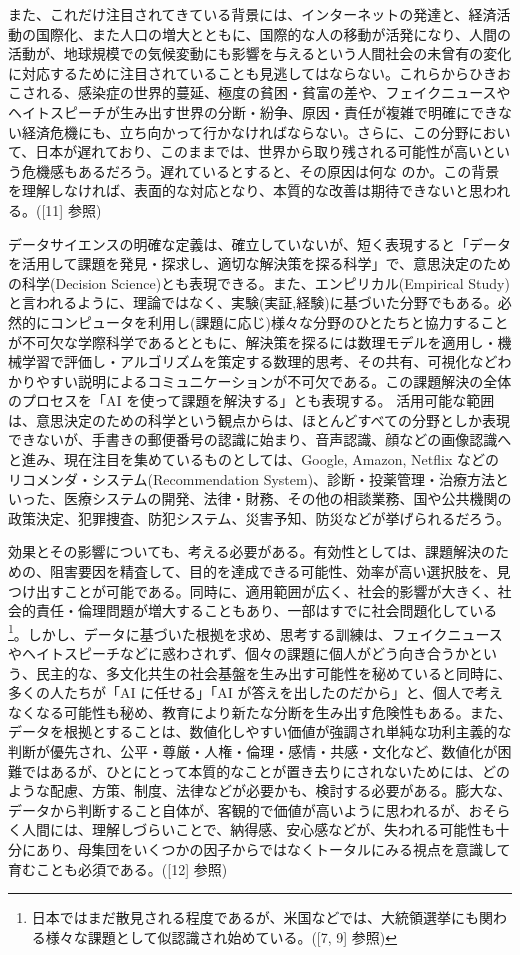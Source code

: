 \documentclass[
]{book}
\theoremstyle{definition}
\theoremstyle{definition}
\theoremstyle{definition}
\theoremstyle{definition}
\theoremstyle{remark}
\begin{document}
また、これだけ注目されてきている背景には、インターネットの発達と、経済活動の国際化、また人口の増大とともに、国際的な人の移動が活発になり、人間の活動が、地球規模での気候変動にも影響を与えるという人間社会の未曾有の変化に対応するために注目されていることも見逃してはならない。これらからひきおこされる、感染症の世界的蔓延、極度の貧困・貧富の差や、フェイクニュースやヘイトスピーチが生み出す世界の分断・紛争、原因・責任が複雑で明確にできない経済危機にも、立ち向かって行かなければならない。さらに、この分野において、日本が遅れており、このままでは、世界から取り残される可能性が高いという危機感もあるだろう。遅れているとすると、その原因は何な
のか。この背景を理解しなければ、表面的な対応となり、本質的な改善は期待できないと思われる。({[}11{]} 参照)

データサイエンスの明確な定義は、確立していないが、短く表現すると「データを活用して課題を発見・探求し、適切な解決策を探る科学」で、意思決定のための科学(Decision Science)とも表現できる。また、エンピリカル(Empirical Study)と言われるように、理論ではなく、実験(実証,経験)に基づいた分野でもある。必然的にコンピュータを利用し(課題に応じ)様々な分野のひとたちと協力することが不可欠な学際科学であるとともに、解決策を探るには数理モデルを適用し・機械学習で評価し・アルゴリズムを策定する数理的思考、その共有、可視化などわかりやすい説明によるコミュニケーションが不可欠である。この課題解決の全体のプロセスを「AI を使って課題を解決する」とも表現する。 活用可能な範囲は、意思決定のための科学という観点からは、ほとんどすべての分野としか表現できないが、手書きの郵便番号の認識に始まり、音声認識、顔などの画像認識へと進み、現在注目を集めているものとしては、Google, Amazon, Netflix などのリコメンダ・システム(Recommendation System)、診断・投薬管理・治療方法といった、医療システムの開発、法律・財務、その他の相談業務、国や公共機関の政策決定、犯罪捜査、防犯システム、災害予知、防災などが挙げられるだろう。

効果とその影響についても、考える必要がある。有効性としては、課題解決のための、阻害要因を精査して、目的を達成できる可能性、効率が高い選択肢を、見つけ出すことが可能である。同時に、適用範囲が広く、社会的影響が大きく、社会的責任・倫理問題が増大することもあり、一部はすでに社会問題化している\footnote{日本ではまだ散見される程度であるが、米国などでは、大統領選挙にも関わる様々な課題として似認識され始めている。({[}7, 9{]} 参照)}。しかし、データに基づいた根拠を求め、思考する訓練は、フェイクニュースやヘイトスピーチなどに惑わされず、個々の課題に個人がどう向き合うかという、民主的な、多文化共生の社会基盤を生み出す可能性を秘めていると同時に、多くの人たちが「AI に任せる」「AI が答えを出したのだから」と、個人で考えなくなる可能性も秘め、教育により新たな分断を生み出す危険性もある。また、データを根拠とすることは、数値化しやすい価値が強調され単純な功利主義的な判断が優先され、公平・尊厳・人権・倫理・感情・共感・文化など、数値化が困難ではあるが、ひとにとって本質的なことが置き去りにされないためには、どのような配慮、方策、制度、法律などが必要かも、検討する必要がある。膨大な、データから判断すること自体が、客観的で価値が高いように思われるが、おそらく人間には、理解しづらいことで、納得感、安心感などが、失われる可能性も十分にあり、母集団をいくつかの因子からではなくトータルにみる視点を意識して育むことも必須である。({[}12{]} 参照)
\end{document}
